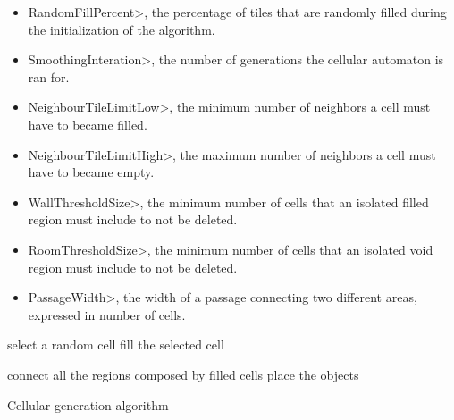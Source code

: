 \begin{itemize}
\item \<RandomFillPercent>, the percentage of tiles that are randomly filled during the initialization of the algorithm.
\item \<SmoothingInteration>, the number of generations the cellular automaton is ran for.
\item \<NeighbourTileLimitLow>, the minimum number of neighbors a cell must have to became filled.
\item \<NeighbourTileLimitHigh>, the maximum number of neighbors a cell must have to became empty.
\item \<WallThresholdSize>, the minimum number of cells that an isolated filled region must include to not be deleted.
\item \<RoomThresholdSize>, the minimum number of cells that an isolated void region must include to not be deleted.
\item \<PassageWidth>, the width of a passage connecting two different areas, expressed in number of cells.
\end{itemize}

\par



\begin{algorithm}[H]
\label{alg:cellular}
\SetAlgoLined


 {
	select a random cell\;
	fill the selected cell\;
}

 {
}



connect all the regions composed by filled cells\;
place the objects\;

\caption{Cellular generation algorithm}
\end{algorithm}

